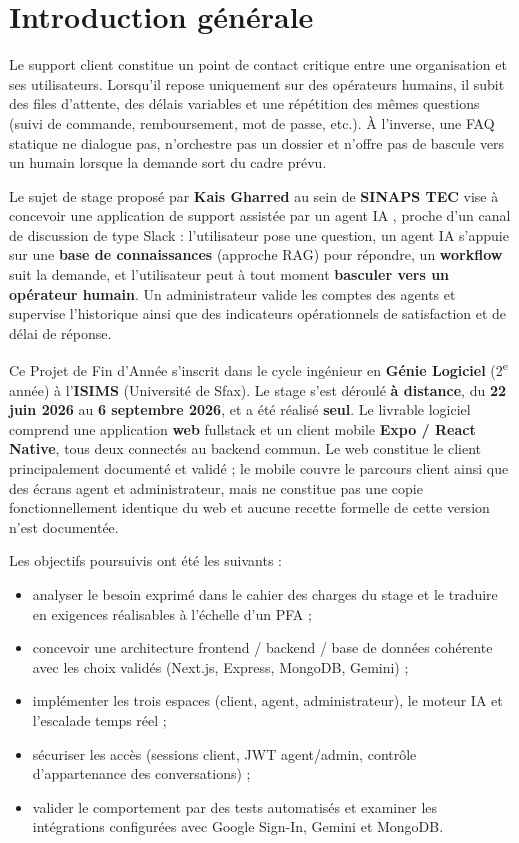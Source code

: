 \chapter*{Introduction générale}

Le support client constitue un point de contact critique entre une organisation et ses utilisateurs. Lorsqu'il repose uniquement sur des opérateurs humains, il subit des files d'attente, des délais variables et une répétition des mêmes questions (suivi de commande, remboursement, mot de passe, etc.). À l'inverse, une FAQ statique ne dialogue pas, n'orchestre pas un dossier et n'offre pas de bascule vers un humain lorsque la demande sort du cadre prévu.

Le sujet de stage proposé par \textbf{Kais Gharred} au sein de \textbf{SINAPS TEC} vise à concevoir une application de support \og assistée par un agent IA \fg{}, proche d'un canal de discussion de type Slack : l'utilisateur pose une question, un agent IA s'appuie sur une \textbf{base de connaissances} (approche RAG) pour répondre, un \textbf{workflow} suit la demande, et l'utilisateur peut à tout moment \textbf{basculer vers un opérateur humain}. Un administrateur valide les comptes des agents et supervise l'historique ainsi que des indicateurs opérationnels de satisfaction et de délai de réponse.

Ce Projet de Fin d'Année s'inscrit dans le cycle ingénieur en \textbf{Génie Logiciel} (2\textsuperscript{e} année) à l'\textbf{ISIMS} (Université de Sfax). Le stage s'est déroulé \textbf{à distance}, du \textbf{22 juin 2026} au \textbf{6 septembre 2026}, et a été réalisé \textbf{seul}. Le livrable logiciel comprend une application \textbf{web} fullstack et un client mobile \textbf{Expo / React Native}, tous deux connectés au backend commun. Le web constitue le client principalement documenté et validé ; le mobile couvre le parcours client ainsi que des écrans agent et administrateur, mais ne constitue pas une copie fonctionnellement identique du web et aucune recette formelle de cette version n'est documentée.

Les objectifs poursuivis ont été les suivants :
\begin{itemize}[leftmargin=1.4em]
  \item analyser le besoin exprimé dans le cahier des charges du stage et le traduire en exigences réalisables à l'échelle d'un PFA ;
  \item concevoir une architecture frontend / backend / base de données cohérente avec les choix validés (Next.js, Express, MongoDB, Gemini) ;
  \item implémenter les trois espaces (client, agent, administrateur), le moteur IA et l'escalade temps réel ;
  \item sécuriser les accès (sessions client, JWT agent/admin, contrôle d'appartenance des conversations) ;
  \item valider le comportement par des tests automatisés et examiner les intégrations configurées avec Google Sign-In, Gemini et MongoDB.
\end{itemize}

